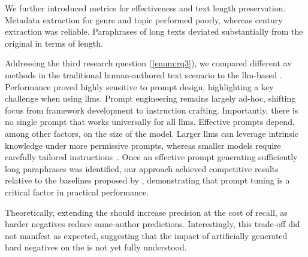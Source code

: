We further introduced metrics for \pextractor{} effectiveness and text length preservation. 
Metadata extraction for genre and topic performed poorly, whereas century extraction was reliable. 
Paraphrases of long \dataGutenberg{} texts deviated substantially from the original in terms of length.  


Addressing the third research question (\ref{enum:rq3}), we compared different \ac{av} methods in the traditional human-authored text scenario 
to the \ac{llm}-based \impAppr{}.
Performance proved highly sensitive to prompt design, highlighting a key challenge when using \acp{llm}. 
Prompt engineering remains largely ad-hoc, shifting focus from framework development to instruction crafting. 
Importantly, there is no single prompt that works universally for all \acp{llm}. 
Effective prompts depend, among other factors, on the size of the model. 
Larger \acp{llm} can leverage intrinsic knowledge under more permissive prompts, whereas smaller models require carefully tailored instructions~\citep{schmidt_llm_av_latin_24}.
Once an effective prompt generating sufficiently long paraphrases was identified, our approach achieved competitive results relative to the baselines proposed by \citet{koppel_determining_2014}, demonstrating that prompt tuning is a critical factor in practical performance.

Theoretically, extending the \impAppr{} should increase precision at the cost of recall, as harder negatives reduce same-author predictions. 
Interestingly, this trade-off did not manifest as expected, suggesting that the impact of artificially generated hard negatives on the \impAppr{} is not yet fully understood.